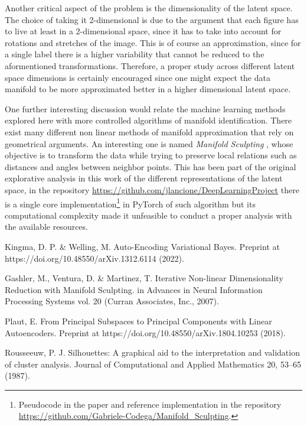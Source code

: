 \documentclass[twocolumn,gsifonts,twoside]{gsipaper}
\begin{document}
Another critical aspect of the problem is the dimensionality of the latent space. The choice of taking it 2-dimensional is due to the argument that each figure has to live at least in a 2-dimensional space, since it has to take into account for rotations and stretches of the image. This is of course an approximation, since for a single label there is a higher variability that cannot be reduced to the aformentioned transformations. Therefore, a proper study across different latent space dimensions is certainly encouraged since one might expect the data manifold to be more approximated better in a higher dimensional latent space.

One further interesting discussion would relate the machine learning methods explored here with more controlled algorithms of manifold identification. There exist many different non linear methods of manifold approximation that rely on geometrical arguments. An interesting one is named \emph{Manifold Sculpting} \cite{Gashler2007}, whose objective is to transform the data while trying to preserve local relations such as distances and angles between neighbor points. This has been part of the original explorative analysis in this work of the different representations of the latent space, in the repository \url{https://github.com/jlancione/DeepLearningProject}
there is a single core implementation\footnote{Pseudocode in the paper \cite{Gashler2007} and reference implementation in the repository \url{https://github.com/Gabriele-Codega/Manifold_Sculpting}.
} in PyTorch of such algorithm but its computational complexity made it unfeasible to conduct a proper analysis with the available resources. 



%  

\begin{thebibliography}{99}
  Kingma, D. P. \& Welling, M. Auto-Encoding Variational Bayes. Preprint at https://doi.org/10.48550/arXiv.1312.6114 (2022).

  Gashler, M., Ventura, D. \& Martinez, T. Iterative Non-linear Dimensionality Reduction with Manifold Sculpting. in Advances in Neural Information Processing Systems vol. 20 (Curran Associates, Inc., 2007).

  Plaut, E. From Principal Subspaces to Principal Components with Linear Autoencoders. Preprint at https://doi.org/10.48550/arXiv.1804.10253 (2018).

  Rousseeuw, P. J. Silhouettes: A graphical aid to the interpretation and validation of cluster analysis. Journal of Computational and Applied Mathematics 20, 53–65 (1987).
\end{thebibliography}
\end{document}
